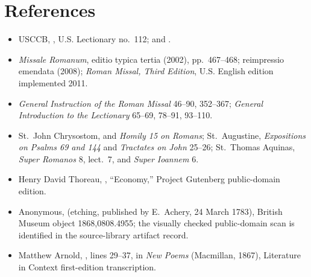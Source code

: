 \section*{References}
\begin{itemize}
\item USCCB, , U.S. Lectionary no.~112; and .
\item \emph{Missale Romanum}, editio typica tertia (2002), pp.~467--468; reimpressio emendata (2008); \emph{Roman Missal, Third Edition}, U.S. English edition implemented 2011.
\item \emph{General Instruction of the Roman Missal} 46--90, 352--367; \emph{General Introduction to the Lectionary} 65--69, 78--91, 93--110.
\item St.~John Chrysostom,  and \emph{Homily 15 on Romans}; St.~Augustine, \emph{Expositions on Psalms 69 and 144} and \emph{Tractates on John} 25--26; St.~Thomas Aquinas, \emph{Super Romanos} 8, lect.~7, and \emph{Super Ioannem} 6.
\item Henry David Thoreau, , “Economy,” Project Gutenberg public-domain edition.
\item Anonymous,  (etching, published by E.~Achery, 24 March 1783), British Museum object 1868,0808.4955; the visually checked public-domain scan is identified in the source-library artifact record.
\item Matthew Arnold, , lines 29--37, in \emph{New Poems} (Macmillan, 1867), Literature in Context first-edition transcription.
\end{itemize}

